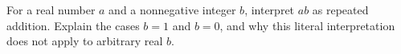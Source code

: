 For a real number $a$ and a nonnegative integer $b$, interpret $ab$ as repeated addition. Explain the cases $b=1$ and $b=0$, and why this literal interpretation does not apply to arbitrary real $b$.
